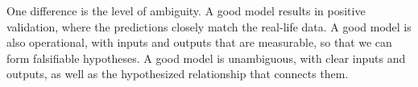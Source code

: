\documentclass[12pt]{article}
\begin{document}
\begin{enumerate}

One difference is the level of ambiguity. A good model results in positive validation,
where the predictions closely match the real-life data. A good model is also operational,
with inputs and outputs that are measurable, so that we can form falsifiable hypotheses.
A good model is unambiguous, with clear inputs and outputs, as well as the hypothesized
relationship that connects them.

\end{enumerate}




\end{document}
